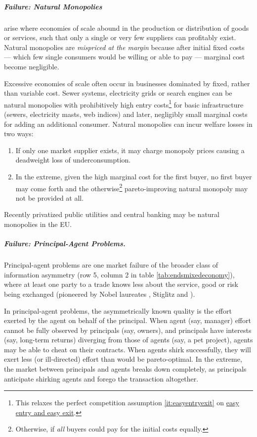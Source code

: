 \subparagraph{Failure: Natural Monopolies}  \label{sec:naturalmonopoly} arise where economies of scale abound in the production or distribution of goods or services, such that only a single or very few suppliers can profitably exist. Natural monopolies are \emph{mispriced at the margin} because after initial fixed costs --- which few single consumers would be willing or able to pay --- marginal cost become negligible.

Excessive economies of scale often occur in businesses dominated by fixed, rather than variable cost. Sewer systems, electricity grids or search engines can be natural monopolies with prohibitively high entry costs\footnote{
	This relaxes the perfect competition assumption \ref{it:easyentryexit} on \hyperref[it:easyentryexit]{easy entry and easy exit}.} 
for basic infrastructure (sewers, electricity masts, web indices) and later, negligibly small marginal costs for adding an additional consumer.  Natural monopolies can incur welfare losses in two ways: 
\begin{enumerate}
	\item If only one market supplier exists, it may charge monopoly prices causing a deadweight loss of underconsumption. 
	\item In the extreme, given the high marginal cost for the first buyer, no first buyer may come forth and the otherwise\footnote{
		Otherwise, if \emph{all} buyers could pay for the initial costs equally.} pareto-improving natural monopoly may not be provided at all.
\end{enumerate} 
Recently privatized public utilities and central banking may be natural monopolies in the \gls{EU}.

\subparagraph[Failure: Principal-Agent Problems]{Failure: Principal-Agent Problems.} \label{sec:principal-agentproblem} 
Principal-agent problems are one market failure of the broader class of information asymmetry (row 5, column 2 in table \ref{tab:endsmixedeconomy}), where at least one party to a trade knows less about the service, good or risk being exchanged (pioneered by Nobel laureates \citealt{Akerlof-1970-aa}, Stiglitz \citeyear{Stiglitz1976} and \citealt{Spence1974}).

In principal-agent problems, the asymmetrically known quality is the effort exerted by the agent on behalf of the principal. When agent (say, manager) effort cannot be fully observed by principals (say, owners), and principals have interests (say, long-term returns) diverging from those of agents (say, a pet project), agents may be able to cheat on their contracts. When agents shirk successfully, they will exert less (or ill-directed) effort than would be pareto-optimal. In the extreme, the market between principals and agents breaks down completely, as principals anticipate shirking agents and forego the transaction altogether. 

